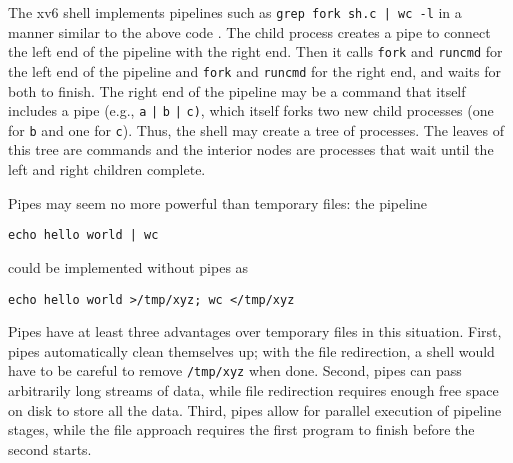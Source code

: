 The xv6 shell implements pipelines such as
\lstinline{grep fork sh.c | wc -l}
in a manner similar to the above code
.
The child process creates a pipe to connect the left end of the pipeline
with the right end. Then it calls
\lstinline{fork}
and
\lstinline{runcmd}
for the left end of the pipeline
and 
\lstinline{fork}
and
\lstinline{runcmd}
for the right end, and waits for both to finish.
The right end of the pipeline may be a command that itself includes a
pipe (e.g.,
\lstinline{a}
\lstinline{|}
\lstinline{b}
\lstinline{|}
\lstinline{c)}, 
which itself forks two new child processes (one for
\lstinline{b}
and one for
\lstinline{c}).
Thus, the shell may
create a tree of processes.  The leaves of this tree are commands and
the interior nodes are processes that wait until the left and right
children complete.


Pipes may seem no more powerful than temporary files:
the pipeline
\begin{lstlisting}[]
echo hello world | wc
\end{lstlisting}
could be implemented without pipes as
\begin{lstlisting}[]
echo hello world >/tmp/xyz; wc </tmp/xyz
\end{lstlisting}
Pipes have at least three advantages over temporary files
in this situation.
First, pipes automatically clean themselves up;
with the file redirection, a shell would have to
be careful to remove
\lstinline{/tmp/xyz}
when done.
Second, pipes can pass arbitrarily long streams of
data, while file redirection requires enough free space
on disk to store all the data.
Third, pipes allow for parallel execution of pipeline stages,
while the file approach requires the first program to finish
before the second starts.
